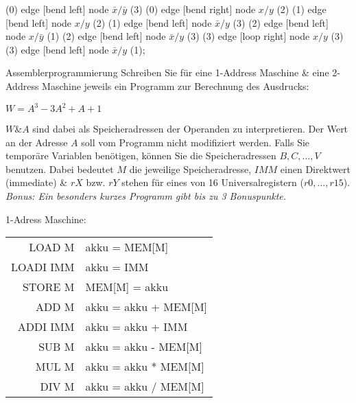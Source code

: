 \documentclass{exercisesheet}
\begin{document}
\begin{solutions}
{    
    (0) edge [bend left] node {$\bar x/\bar y$} (3)
    (0) edge [bend right] node {$x/y$} (2)
    (1) edge [bend left] node {$x/y$} (2)
    (1) edge [bend left] node {$\bar x/y$} (3)
    (2) edge [bend left] node {$x/\bar y$} (1)
    (2) edge [bend left] node {$\bar x/y$} (3)
    (3) edge [loop right] node {$x/y$} (3)
    (3) edge [bend left] node {$\bar x/y$} (1);
  }
\end{solutions}

\begin{exercise}{Assemblerprogrammierung}
  Schreiben Sie für eine 1-Address Maschine \& eine 2-Address Maschine jeweils ein Programm zur Berechnung des Ausdrucks:\par
  \begin{center}$W = A^3 - 3A^2 + A + 1$\end{center}
  $W$\&$A$ sind dabei als Speicheradressen der Operanden zu interpretieren. Der Wert an der Adresse $A$ soll vom Programm nicht modifiziert werden. Falls Sie temporäre Variablen benötigen, können Sie die Speicheradressen $B, C, ..., V$ benutzen. Dabei bedeutet $M$ die jeweilige Speicheradresse, $IMM$ einen Direktwert (immediate) \& $rX$ bzw. $rY$ stehen für eines von 16 Universalregistern ($r0, ..., r15$).\\
  \textit{Bonus: Ein besonders kurzes Programm gibt bis zu 3 Bonuspunkte.}
  \begin{multicols}{2}
    1-Adress Maschine:\par
    \begin{tabular}{|r|l|}
      \hline
      LOAD M    & akku = MEM[M]        \\
      LOADI IMM & akku = IMM           \\
      STORE M   & MEM[M] = akku        \\
      ADD M     & akku = akku + MEM[M] \\
      ADDI IMM  & akku = akku + IMM    \\
      SUB M     & akku = akku - MEM[M] \\
      MUL M     & akku = akku * MEM[M] \\
      DIV M     & akku = akku / MEM[M] \\
      \hline
    \end{tabular}
    \columnbreak


\end{multicols}
\end{exercise}
\end{document}
